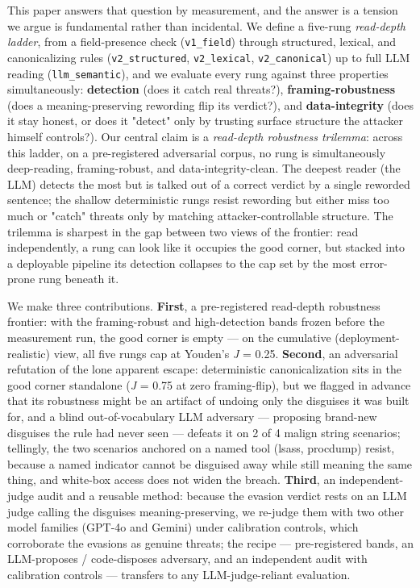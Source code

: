 \documentclass[sigconf,anonymous,review]{acmart}
\begin{document}
This paper answers that question by measurement, and the answer is a tension we argue is fundamental rather than incidental. We define a five-rung \textit{read-depth ladder}, from a field-presence check (\texttt{v1\_field}) through structured, lexical, and canonicalizing rules (\texttt{v2\_structured}, \texttt{v2\_lexical}, \texttt{v2\_canonical}) up to full LLM reading (\texttt{llm\_semantic}), and we evaluate every rung against three properties simultaneously: \textbf{detection} (does it catch real threats?), \textbf{framing-robustness} (does a meaning-preserving rewording flip its verdict?), and \textbf{data-integrity} (does it stay honest, or does it "detect" only by trusting surface structure the attacker himself controls?). Our central claim is a \textit{read-depth robustness trilemma}: across this ladder, on a pre-registered adversarial corpus, no rung is simultaneously deep-reading, framing-robust, and data-integrity-clean. The deepest reader (the LLM) detects the most but is talked out of a correct verdict by a single reworded sentence; the shallow deterministic rungs resist rewording but either miss too much or "catch" threats only by matching attacker-controllable structure. The trilemma is sharpest in the gap between two views of the frontier: read independently, a rung can look like it occupies the good corner, but stacked into a deployable pipeline its detection collapses to the cap set by the most error-prone rung beneath it.

We make three contributions. \textbf{First}, a pre-registered read-depth robustness frontier: with the framing-robust and high-detection bands frozen before the measurement run, the good corner is empty --- on the cumulative (deployment-realistic) view, all five rungs cap at Youden's \textit{J} = 0.25. \textbf{Second}, an adversarial refutation of the lone apparent escape: deterministic canonicalization sits in the good corner standalone (\textit{J} = 0.75 at zero framing-flip), but we flagged in advance that its robustness might be an artifact of undoing only the disguises it was built for, and a blind out-of-vocabulary LLM adversary --- proposing brand-new disguises the rule had never seen --- defeats it on 2 of 4 malign string scenarios; tellingly, the two scenarios anchored on a named tool (lsass, procdump) resist, because a named indicator cannot be disguised away while still meaning the same thing, and white-box access does not widen the breach. \textbf{Third}, an independent-judge audit and a reusable method: because the evasion verdict rests on an LLM judge calling the disguises meaning-preserving, we re-judge them with two other model families (GPT-4o and Gemini) under calibration controls, which corroborate the evasions as genuine threats; the recipe --- pre-registered bands, an LLM-proposes / code-disposes adversary, and an independent audit with calibration controls --- transfers to any LLM-judge-reliant evaluation.
\end{document}
